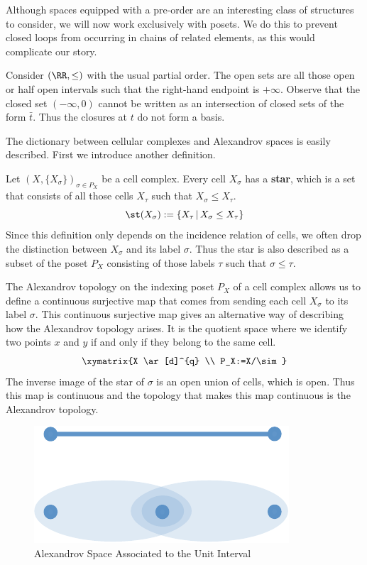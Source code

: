 \begin{rmk}
	Although spaces equipped with a pre-order are an interesting class of structures to consider, we will now work exclusively with posets. We do this to prevent closed loops from occurring in chains of related elements, as this would complicate our story.
\end{rmk}

\begin{ex}\label{ex:closed_gen}
	Consider $(\RR,\leq)$ with the usual partial order. The open sets are all those open or half open intervals such that the right-hand endpoint is $+\infty$. Observe that the closed set $(-\infty,0)$ cannot be written as an intersection of closed sets of the form $\bar{t}$. Thus the closures at $t$ do not form a basis.
\end{ex}

The dictionary between cellular complexes and Alexandrov spaces is easily described. First we introduce another definition.

\begin{defn}[Star]
	Let $(X,\{X_{\sigma}\})_{\sigma\in P_X}$ be a cell complex. Every cell $X_{\sigma}$ has a \textbf{star}, which is a set that consists of all those cells $X_{\tau}$ such that $X_{\sigma}\leq X_{\tau}$. 
	\[
		\st(X_{\sigma}):=\{X_{\tau}\,|\,X_{\sigma}\leq X_{\tau} \}
	\]
	Since this definition only depends on the incidence relation of cells, we often drop the distinction between $X_{\sigma}$ and its label $\sigma$. Thus the star is also described as a subset of the poset $P_X$ consisting of those labels $\tau$ such that $\sigma\leq\tau$.
\end{defn}

The Alexandrov topology on the indexing poset $P_X$ of a cell complex allows us to define a continuous surjective map that comes from sending each cell $X_{\sigma}$ to its label $\sigma$.
This continuous surjective map gives an alternative way of describing how the Alexandrov topology arises. It is the quotient space where we identify two points $x$ and $y$ if and only if they belong to the same cell.
\[
	\xymatrix{X \ar[d]^{q} \\ P_X:=X/\sim}
\]
The inverse image of the star of $\sigma$ is an open union of cells, which is open. Thus this map is continuous and the topology that makes this map continuous is the Alexandrov topology.

\begin{figure}[ht]
	\centering
	\includegraphics[width=.5\textwidth]{alex_interval.pdf}
	\caption{Alexandrov Space Associated to the Unit Interval}
	\label{fig:alex_interval}
\end{figure}


